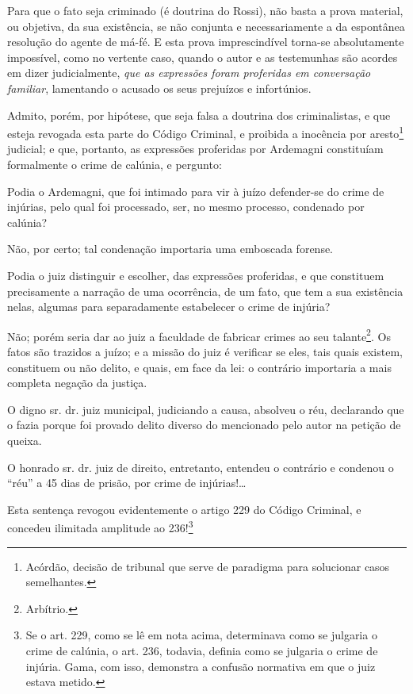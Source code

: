Para que o fato seja criminado (é doutrina do Rossi), não basta a prova
material, ou objetiva, da sua existência, se não conjunta e
necessariamente a da espontânea resolução do agente de má-fé. E esta
prova imprescindível torna-se absolutamente impossível, como no vertente
caso, quando o autor e as testemunhas são acordes em dizer
judicialmente, \emph{que as expressões foram proferidas em conversação
familiar}, lamentando o acusado os seus prejuízos e infortúnios.

Admito, porém, por hipótese, que seja falsa a doutrina dos
criminalistas, e que esteja revogada esta parte do Código Criminal, e
proibida a inocência por aresto\footnote{ Acórdão, decisão de tribunal
  que serve de paradigma para solucionar casos semelhantes.} judicial; e
que, portanto, as expressões proferidas por Ardemagni constituíam
formalmente o crime de calúnia, e pergunto:

Podia o Ardemagni, que foi intimado para vir à juízo defender-se do
crime de injúrias, pelo qual foi processado, ser, no mesmo processo,
condenado por calúnia?

Não, por certo; tal condenação importaria uma emboscada forense.

Podia o juiz distinguir e escolher, das expressões proferidas, e que
constituem precisamente a narração de uma ocorrência, de um fato, que
tem a sua existência nelas, algumas para separadamente estabelecer o
crime de injúria?

Não; porém seria dar ao juiz a faculdade de fabricar crimes ao seu
talante\footnote{ Arbítrio.}. Os fatos são trazidos a juízo; e a missão
do juiz é verificar se eles, tais quais existem, constituem ou não
delito, e quais, em face da lei: o contrário importaria a mais completa
negação da justiça.

O digno sr. dr. juiz municipal, judiciando a causa, absolveu o réu,
declarando que o fazia porque foi provado delito diverso do mencionado
pelo autor na petição de queixa.

O honrado sr. dr. juiz de direito, entretanto, entendeu o contrário e
condenou o ``réu'' a 45 dias de prisão, por crime de injúrias!\ldots{}

Esta sentença revogou evidentemente o artigo 229 do Código Criminal, e
concedeu ilimitada amplitude ao 236!\footnote{ Se o art. 229, como se
  lê em nota acima, determinava como se julgaria o crime de calúnia, o
  art. 236, todavia, definia como se julgaria o crime de injúria. Gama,
  com isso, demonstra a confusão normativa em que o juiz estava metido.}

